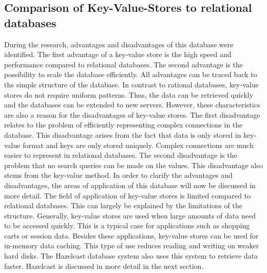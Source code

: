 \subsection{Comparison of Key-Value-Stores to relational databases}

During the research, advantages and disadvantages of this database were identified. 
The first advantage of a key-value store is the high speed and performance compared to relational databases.
The second advantage is the possibility to scale the database efficiently. 
All advantages can be traced back to the simple structure of the database. 
In contrast to rational databases, key-value stores do not require uniform patterns. 
Thus, the data can be retrieved quickly and the databases can be extended to new servers. 
However, these characteristics are also a reason for the disadvantages of key-value stores. 
The first disadvantage relates to the problem of efficiently representing complex connections in the database. 
This disadvantage arises from the fact that data is only stored in key-value format and keys are only stored uniquely. 
Complex connections are much easier to represent in relational databases. 
The second disadvantage is the problem that no search queries can be made on the values. 
This disadvantage also stems from the key-value method. 
In order to clarify the advantages and disadvantages, the areas of application of this database will now be discussed in more detail. 
The field of application of key-value stores is limited compared to relational databases. 
This can largely be explained by the limitations of the structure. 
Generally, key-value stores are used when large amounts of data need to be accessed quickly. 
This is a typical case for applications such as shopping carts or session data. 
Besides these applications, key-value stores can be used for in-memory data caching. 
This type of use reduces reading and writing on weaker hard disks. 
The Hazelcast database system also uses this system to retrieve data faster. 
Hazelcast is discussed in more detail in the next section. \parencite{Key_Value_Datastore_Hazelcast, Key_Value_Datastore}